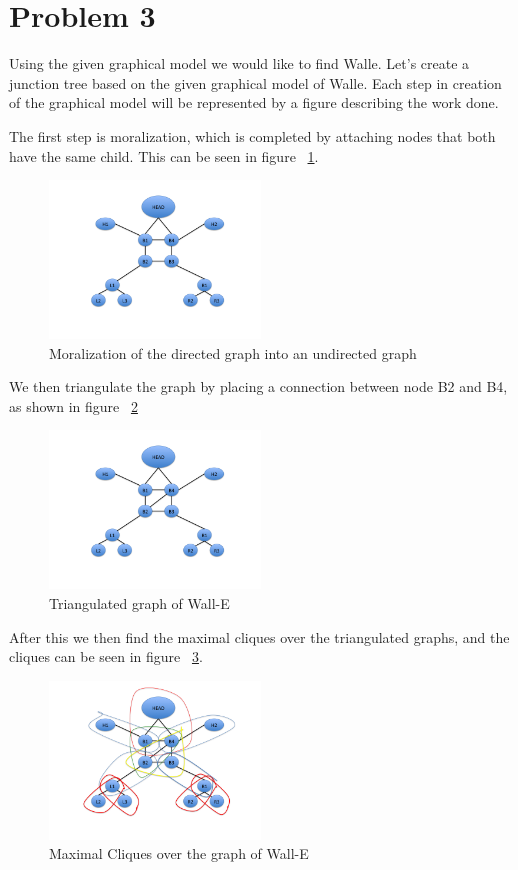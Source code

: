 \documentclass[paper=a4, fontsize=11pt]{scrartcl} %
\begin{document}
\section{Problem 3}
Using the given graphical model we would like to find Walle.  
Let's create a junction tree based on the given graphical model of Walle.
Each step in creation of the graphical model will be represented by a figure describing the work done. 

The first step is moralization, which is completed by attaching nodes that both have the same child.  This can be seen in figure ~\ref{fig:moralization}.

\begin{figure}
\centering
\includegraphics[width=0.5\textwidth]{Problem3/Slide1.png}
\caption{Moralization of the directed graph into an undirected graph}
\label{fig:moralization}
\end{figure}

We then triangulate the graph by placing a connection between node B2 and B4, as shown in figure ~\ref{fig:trig}

\begin{figure}
\centering
\includegraphics[width=0.5\textwidth]{Problem3/Slide2.png}
\caption{Triangulated graph of Wall-E}
\label{fig:trig}
\end{figure}

After this we then find the maximal cliques over the triangulated graphs, and the cliques can be seen in figure ~\ref{fig:clique}.

\begin{figure}
\centering
\includegraphics[width=0.5\textwidth]{Problem3/Slide3.png}
\caption{Maximal Cliques over the graph of Wall-E}
\label{fig:clique}
\end{figure}
\end{document}
